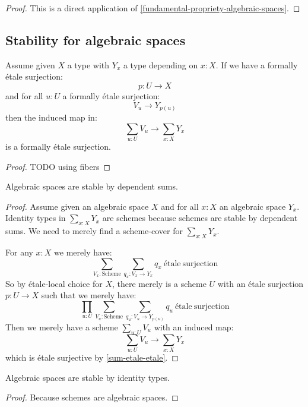 \begin{proof}
This is a direct application of \cref{fundamental-propriety-algebraic-spaces}.
\end{proof}

\subsection{Stability for algebraic spaces}

\begin{lemma}\label{sum-etale-etale}
Assume given $X$ a type with $Y_x$ a type depending on $x:X$. If we have a formally étale surjection:
\[p:U\to X\]
and for all $u:U$ a formally étale surjection:
\[V_u \to Y_{p(u)}\]
then the induced map in:
\[\sum_{u:U} V_u \to \sum_{x:X}Y_x\]
is a formally étale surjection.
\end{lemma}

\begin{proof}
TODO using fibers
\end{proof}

\begin{lemma}\label{algebraic-space-sum}
Algebraic spaces are stable by dependent sums.
\end{lemma}

\begin{proof}
Assume given an algebraic space $X$ and for all $x:X$ an algebraic space $Y_x$. Identity types in $\sum_{x:X} Y_x$ are schemes because schemes are stable by dependent sums. We need to merely find a scheme-cover for $\sum_{x:X} Y_x$. 

For any $x:X$ we merely have:
\[\sum_{V_x:\mathrm{Scheme}} \sum_{q_x: V_x \to Y_x} q_x\ \mathrm{étale\ surjection}\]
So by étale-local choice for $X$, there merely is a scheme $U$ with an étale surjection $p: U \to X$ such that we merely have:
\[\prod_{u:U} \sum_{V_u:\mathrm{Scheme}} \sum_{q_u: V_u \to Y_{p(u)}} q_u\ \mathrm{étale\ surjection}\]
Then we merely have a scheme $\sum_{u:U}V_u$ with an induced map:
\[\sum_{u:U}V_u \to \sum_{x:X} Y_x\]
which is étale surjective by \cref{sum-etale-etale}.
\end{proof}

\begin{lemma}\label{algebraic-space-identity}
Algebraic spaces are stable by identity types.
\end{lemma}

\begin{proof}
Because schemes are algebraic spaces.
\end{proof}

